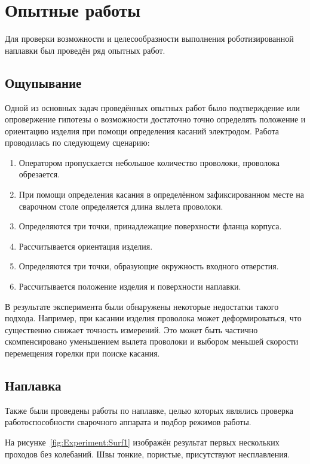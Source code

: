 \chapter{Опытные работы}
Для проверки возможности и целесообразности выполнения роботизированной наплавки был проведён ряд опытных работ.


\section{Ощупывание}
Одной из основных задач проведённых опытных работ было подтверждение или опровержение гипотезы о возможности достаточно точно определять положение и ориентацию изделия при помощи определения касаний электродом.
Работа проводилась по следующему сценарию:

\begin{enumerate}
    \item Оператором пропускается небольшое количество проволоки, проволока обрезается.
    \item При помощи определения касания в определённом зафиксированном месте на сварочном столе определяется длина вылета проволоки.
    \item Определяются три точки, принадлежащие поверхности фланца корпуса.
    \item Рассчитывается ориентация изделия.
    \item Определяются три точки, образующие окружность входного отверстия.
    \item Рассчитывается положение изделия и поверхности наплавки.
\end{enumerate}

В результате эксперимента были обнаружены некоторые недостатки такого подхода.
Например, при касании изделия проволока может деформироваться, что существенно снижает точность измерений.
Это может быть частично скомпенсировано уменьшением вылета проволоки и выбором меньшей скорости перемещения горелки при поиске касания.


\section{Наплавка}
Также были проведены работы по наплавке, целью которых являлись проверка работоспособности сварочного аппарата и подбор режимов работы.

На рисунке~\ref{fig:Experiment:Surf1} изображён результат первых нескольких проходов без колебаний.
Швы тонкие, пористые, присутствуют несплавления.

